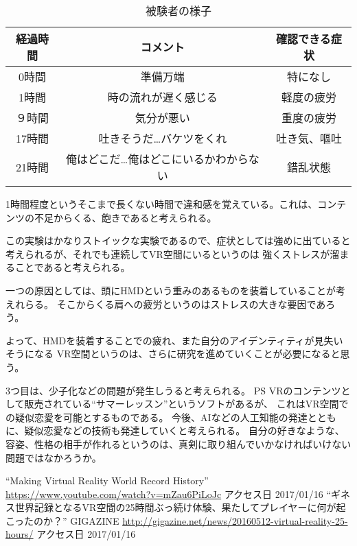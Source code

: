 \documentclass[11pt,a4j]{jsarticle}
\begin{document}
\begin{table}[H]
  \caption{被験者の様子}
  \label{tab:vrex}
  \small
  \begin{center}
      \begin{tabular}{c|c|c}
        \hline
        \toprule
        経過時間	&	コメント	&	確認できる症状	\\
        \midrule
        0時間	&	準備万端	&	特になし	\\
        1時間	&	時の流れが遅く感じる	&	軽度の疲労 \\
        ９時間	&	気分が悪い	&	重度の疲労	\\
        17時間	&	吐きそうだ…バケツをくれ	&	吐き気、嘔吐 \\
        21時間	&	俺はどこだ…俺はどこにいるかわからない	&	錯乱状態 \\
        \hline
      \end{tabular}
  \end{center}
\end{table}

1時間程度というそこまで長くない時間で違和感を覚えている。これは、コンテンツの不足からくる、飽きであると考えられる。

この実験はかなりストイックな実験であるので、症状としては強めに出ていると考えられるが、それでも連続してVR空間にいるというのは
強くストレスが溜まることであると考えられる。

一つの原因としては、頭にHMDという重みのあるものを装着していることが考えれらる。
そこからくる肩への疲労というのはストレスの大きな要因であろう。

よって、HMDを装着することでの疲れ、また自分のアイデンティティが見失いそうになる
VR空間というのは、さらに研究を進めていくことが必要になると思う。

3つ目は、少子化などの問題が発生しうると考えられる。
PS VRのコンテンツとして販売されている``サマーレッスン''というソフトがあるが、
これはVR空間での疑似恋愛を可能とするものである。
今後、AIなどの人工知能の発達とともに、疑似恋愛などの技術も発達していくと考えられる。
自分の好きなような、容姿、性格の相手が作れるというのは、真剣に取り組んでいかなければいけない問題ではなかろうか。



\begin{thebibliography}{99}
   ``Making Virtual Reality World Record History'' \url{https://www.youtube.com/watch?v=mZau6PiLoJc} アクセス日 2017/01/16
   ``ギネス世界記録となるVR空間の25時間ぶっ続け体験、果たしてプレイヤーに何が起こったのか？'' GIGAZINE \url{http://gigazine.net/news/20160512-virtual-reality-25-hours/} アクセス日 2017/01/16
\end{thebibliography}
\end{document}
